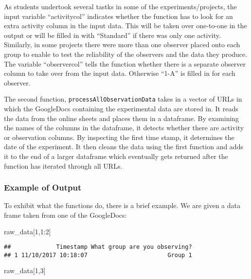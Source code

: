\documentclass[]{article}
\newenvironment{Shaded}{\begin{snugshade}}{\end{snugshade}}
\newcommand{\DecValTok}[1]{\textcolor[rgb]{0.00,0.00,0.81}{{#1}}}
\newcommand{\NormalTok}[1]{{#1}}
\begin{document}
As students undertook several tastks in some of the
experiments/projects, the input variable ``activitycol'' indicates
whether the function has to look for an extra activity column in the
input data. This will be taken over one-to-one in the output or will be
filled in with ``Standard'' if there was only one activity. Similarly,
in some projects there were more than one observer placed onto each
group to enable to test the reliability of the observers and the data
they produce. The variable ``observercol'' tells the function whether
there is a separate observer column to take over from the input data.
Otherwise ``1-A'' is filled in for each observer.

The second function, \texttt{processAllObservationData} takes in a
vector of URLs in which the GoogleDocs containing the experimental data
are stored in. It reads the data from the online sheets and places them
in a dataframe. By examining the names of the columns in the dataframe,
it detects whether there are activity or observation columns. By
inspecting the first time stamp, it determines the date of the
experiment. It then cleans the data using the first function and adds it
to the end of a larger dataframe which eventually gets returned after
the function has iterated through all URLs.

\subsubsection{Example of Output}\label{example-of-output}

To exhibit what the functions do, there is a brief example. We are given
a data frame taken from one of the GoogleDocs:

\begin{Shaded}
\begin{Highlighting}[]
\NormalTok{raw_data[}\DecValTok{1}\NormalTok{,}\DecValTok{1}\NormalTok{:}\DecValTok{2}\NormalTok{]}
\end{Highlighting}
\end{Shaded}

\begin{verbatim}
##             Timestamp What group are you observing?
## 1 11/10/2017 10:18:07                       Group 1
\end{verbatim}

\begin{Shaded}
\begin{Highlighting}[]
\NormalTok{raw_data[}\DecValTok{1}\NormalTok{,}\DecValTok{3}\NormalTok{]}
\end{Highlighting}
\end{Shaded}
\end{document}
